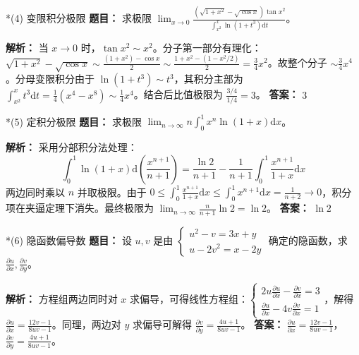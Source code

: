 \documentclass[11pt,a4paper]{article}
\newcommand{\dd}{\mathrm{d}}
\begin{document}
	\vspace{0.3cm}
	\begin{subsection}*{(4) 变限积分极限}
		\textbf{题目：} 求极限 $\lim_{x \to 0} \frac{(\sqrt{1+x^2} - \sqrt{\cos x})\tan x^2}{\int_{x^2}^x \ln(1+t^3)\dd t}$。
		
		\textbf{解析：} 当 $x \to 0$ 时，$\tan x^2 \sim x^2$。分子第一部分有理化：$\sqrt{1+x^2} - \sqrt{\cos x} \sim \frac{(1+x^2) - \cos x}{2} \sim \frac{1+x^2-(1-x^2/2)}{2} = \frac{3}{4}x^2$。故整个分子 $\sim \frac{3}{4}x^4$。分母变限积分由于 $\ln(1+t^3) \sim t^3$，其积分主部为 $\int_{x^2}^x t^3 \dd t = \frac{1}{4}(x^4 - x^8) \sim \frac{1}{4}x^4$。结合后比值极限为 $\frac{3/4}{1/4} = 3$。
		\textbf{答案：} $3$
	\end{subsection}
	
	\vspace{0.3cm}
	\begin{subsection}*{(5) 定积分极限}
		\textbf{题目：} 求极限 $\lim_{n \to \infty} n \int_0^1 x^n \ln(1+x)\dd x$。
		
		\textbf{解析：} 采用分部积分法处理：
		$$ \int_0^1 \ln(1+x)\dd\left(\frac{x^{n+1}}{n+1}\right) = \frac{\ln 2}{n+1} - \frac{1}{n+1}\int_0^1 \frac{x^{n+1}}{1+x}\dd x $$
		两边同时乘以 $n$ 并取极限。由于 $0 \le \int_0^1 \frac{x^{n+1}}{1+x}\dd x \le \int_0^1 x^{n+1}\dd x = \frac{1}{n+2} \to 0$，积分项在夹逼定理下消失。最终极限为 $\lim_{n\to\infty} \frac{n}{n+1}\ln 2 = \ln 2$。
		\textbf{答案：} $\ln 2$
	\end{subsection}
	
	\vspace{0.3cm}
	\begin{subsection}*{(6) 隐函数偏导数}
		\textbf{题目：} 设 $u, v$ 是由 $\begin{cases} u^2 - v = 3x + y \\ u - 2v^2 = x - 2y \end{cases}$ 确定的隐函数，求 $\frac{\partial u}{\partial x}, \frac{\partial v}{\partial y}$。
		
		\textbf{解析：} 方程组两边同时对 $x$ 求偏导，可得线性方程组：$\begin{cases} 2u \frac{\partial u}{\partial x} - \frac{\partial v}{\partial x} = 3 \\ \frac{\partial u}{\partial x} - 4v \frac{\partial v}{\partial x} = 1 \end{cases}$，解得 $\frac{\partial u}{\partial x} = \frac{12v - 1}{8uv - 1}$。同理，两边对 $y$ 求偏导可解得 $\frac{\partial v}{\partial y} = \frac{4u + 1}{8uv - 1}$。
		\textbf{答案：} $\frac{\partial u}{\partial x} = \frac{12v - 1}{8uv - 1}$，$\frac{\partial v}{\partial y} = \frac{4u + 1}{8uv - 1}$。
	\end{subsection}
	
\end{document}
